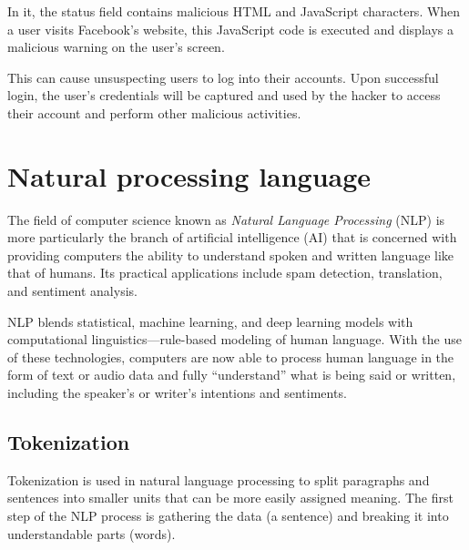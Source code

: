 In it, the status field contains malicious HTML and JavaScript characters. When a user visits Facebook's website, this JavaScript code is executed and displays a malicious warning on the user's screen.

This can cause unsuspecting users to log into their accounts. Upon successful login, the user's credentials will be captured and used by the hacker to access their account and perform other malicious activities.


\section{Natural processing language}
\hspace{0.5cm}The field of computer science known as \emph{Natural Language Processing} (NLP) is more particularly the branch of artificial intelligence (AI) that is concerned with providing computers the ability to understand spoken and written language like that of humans. Its practical applications include spam detection, translation, and sentiment analysis.

NLP blends statistical, machine learning, and deep learning models with computational linguistics—rule-based modeling of human language. With the use of these technologies, computers are now able to process human language in the form of text or audio data and fully ``understand'' what is being said or written, including the speaker's or writer's intentions and sentiments.

\subsection{Tokenization}
\hspace{0.5cm}Tokenization is used in natural language processing to split paragraphs and sentences into smaller units that can be more easily assigned meaning. The first step of the NLP process is gathering the data (a sentence) and breaking it into understandable parts (words). 

